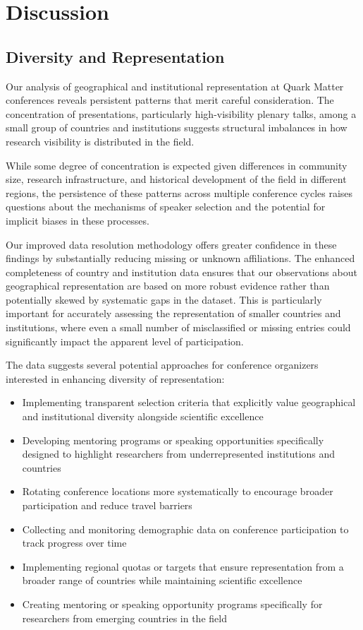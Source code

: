 \documentclass[a4paper,11pt]{article}
\begin{document}
\section{Discussion}

\subsection{Diversity and Representation}

Our analysis of geographical and institutional representation at Quark Matter conferences reveals persistent patterns that merit careful consideration. The concentration of presentations, particularly high-visibility plenary talks, among a small group of countries and institutions suggests structural imbalances in how research visibility is distributed in the field.

While some degree of concentration is expected given differences in community size, research infrastructure, and historical development of the field in different regions, the persistence of these patterns across multiple conference cycles raises questions about the mechanisms of speaker selection and the potential for implicit biases in these processes.

Our improved data resolution methodology offers greater confidence in these findings by substantially reducing missing or unknown affiliations. The enhanced completeness of country and institution data ensures that our observations about geographical representation are based on more robust evidence rather than potentially skewed by systematic gaps in the dataset. This is particularly important for accurately assessing the representation of smaller countries and institutions, where even a small number of misclassified or missing entries could significantly impact the apparent level of participation.

The data suggests several potential approaches for conference organizers interested in enhancing diversity of representation:

\begin{itemize}
    \item Implementing transparent selection criteria that explicitly value geographical and institutional diversity alongside scientific excellence
    \item Developing mentoring programs or speaking opportunities specifically designed to highlight researchers from underrepresented institutions and countries
    \item Rotating conference locations more systematically to encourage broader participation and reduce travel barriers
    \item Collecting and monitoring demographic data on conference participation to track progress over time
    \item Implementing regional quotas or targets that ensure representation from a broader range of countries while maintaining scientific excellence
    \item Creating mentoring or speaking opportunity programs specifically for researchers from emerging countries in the field
\end{itemize}
\end{document}
